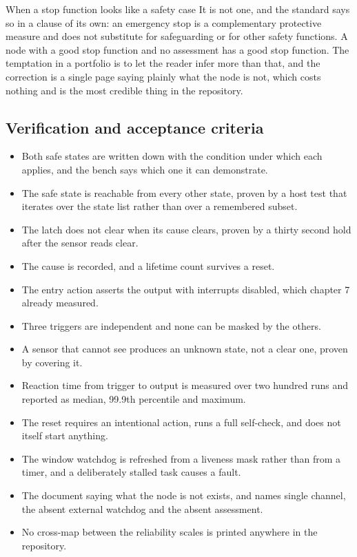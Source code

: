 \begin{note}{When a stop function looks like a safety case}
It is not one, and the standard says so in a clause of its own: an emergency
stop is a complementary protective measure and does not substitute for
safeguarding or for other safety functions. A node with a good stop function and
no assessment has a good stop function. The temptation in a portfolio is to let
the reader infer more than that, and the correction is a single page saying
plainly what the node is not, which costs nothing and is the most credible thing
in the repository.
\end{note}

\subsection*{Verification and acceptance criteria}

\begin{itemize}
\item Both safe states are written down with the condition under which each
applies, and the bench says which one it can demonstrate.
\item The safe state is reachable from every other state, proven by a host test
that iterates over the state list rather than over a remembered subset.
\item The latch does not clear when its cause clears, proven by a thirty second
hold after the sensor reads clear.
\item The cause is recorded, and a lifetime count survives a reset.
\item The entry action asserts the output with interrupts disabled, which
chapter 7 already measured.
\item Three triggers are independent and none can be masked by the others.
\item A sensor that cannot see produces an unknown state, not a clear one,
proven by covering it.
\item Reaction time from trigger to output is measured over two hundred runs and
reported as median, 99.9th percentile and maximum.
\item The reset requires an intentional action, runs a full self-check, and does
not itself start anything.
\item The window watchdog is refreshed from a liveness mask rather than from a
timer, and a deliberately stalled task causes a fault.
\item The document saying what the node is not exists, and names single channel,
the absent external watchdog and the absent assessment.
\item No cross-map between the reliability scales is printed anywhere in the
repository.
\end{itemize}

